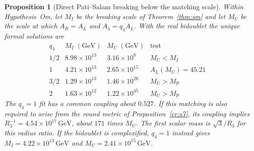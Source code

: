 \documentclass[aps,pra,onecolumn,superscriptaddress,nofootinbib,10pt]{revtex4-2}
\newtheorem{proposition}[theorem]{Proposition}
\theoremstyle{definition}
\theoremstyle{remark}
\begin{document}
\begin{proposition}[Direct Pati--Salam breaking below the matching scale]\label{cr:twostage}
Within Hypothesis~Om, let $M_I$ be the breaking
scale of Theorem~\ref{thm:sm} and let $M_U$ be the scale at which
$A_R=A_L$ and $A_4=q_4 A_L$. With the real bidoublet the unique
formal solutions are
\[
 \begin{array}{c|r|r|l}
 q_4 & M_I\;(\mathrm{GeV})& M_U\;(\mathrm{GeV})&\text{test}\\\hline
 1/2 & 8.98\times10^{13}&3.16\times10^{8} &M_U<M_I\\
 1 &4.21\times10^{13}&2.65\times10^{15}&
             A_L(M_U)=45.21\\
 3/2 &1.29\times10^{13}&1.46\times10^{26}&M_U>M_{\mathrm P}\\
 2 &1.63\times10^{12}&1.22\times10^{45}&M_U>M_{\mathrm P}
 \end{array}
\]
The $q_4=1$ fit has a common coupling about $0.527$.
If this matching is also required to arise from the round
metric of Proposition~\ref{cr:s7}, its coupling implies
$R_3^{-1}=4.54\times10^{17}\,\mathrm{GeV}$, about $171$ times
$M_U$. The first scalar mass is $\sqrt3/R_3$ for this radius ratio.
If the bidoublet is complexified, $q_4=1$ instead gives
$M_I=4.22\times10^{13}\,\mathrm{GeV}$ and
$M_U=2.41\times10^{15}\,\mathrm{GeV}$.
\end{proposition}
\end{document}
